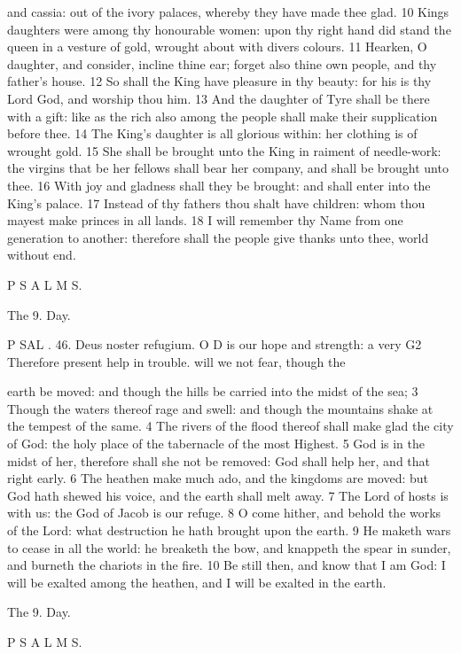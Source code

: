 and cassia: out of the ivory palaces, whereby they have made thee glad. 10 Kings daughters were among thy honourable women: upon thy right hand did stand the queen in a vesture of gold, wrought about with divers colours. 11 Hearken, O daughter, and consider, incline thine ear; forget also thine own people, and thy father's house. 12 So shall the King have pleasure in thy beauty: for his is thy Lord God, and worship thou him. 13 And the daughter of Tyre shall be there with a gift: like as the rich also among the people shall make their supplication before thee. 14 The King’s daughter is all glorious within: her clothing is of wrought gold. 15 She shall be brought unto the King in raiment of needle-work: the virgins that be her fellows shall bear her company, and shall be brought unto thee. 16 With joy and gladness shall they be brought: and shall enter into the King’s palace. 17 Instead of thy fathers thou shalt have children: whom thou mayest make princes in all lands. 18 I will remember thy Name from one generation to another: therefore shall the people give thanks unto thee, world without end.

P S A L M S.

The 9. Day.

P SAL . 46. Deus noster refugium. O D is our hope and strength: a very G2 Therefore present help in trouble. will we not fear, though the

earth be moved: and though the hills be carried into the midst of the sea; 3 Though the waters thereof rage and swell: and though the mountains shake at the tempest of the same. 4 The rivers of the flood thereof shall make glad the city of God: the holy place of the tabernacle of the most Highest. 5 God is in the midst of her, therefore shall she not be removed: God shall help her, and that right early. 6 The heathen make much ado, and the kingdoms are moved: but God hath shewed his voice, and the earth shall melt away. 7 The Lord of hosts is with us: the God of Jacob is our refuge. 8 O come hither, and behold the works of the Lord: what destruction he hath brought upon the earth. 9 He maketh wars to cease in all the world: he breaketh the bow, and knappeth the spear in sunder, and burneth the chariots in the fire. 10 Be still then, and know that I am God: I will be exalted among the heathen, and I will be exalted in the earth.

The 9. Day.

P S A L M S.

